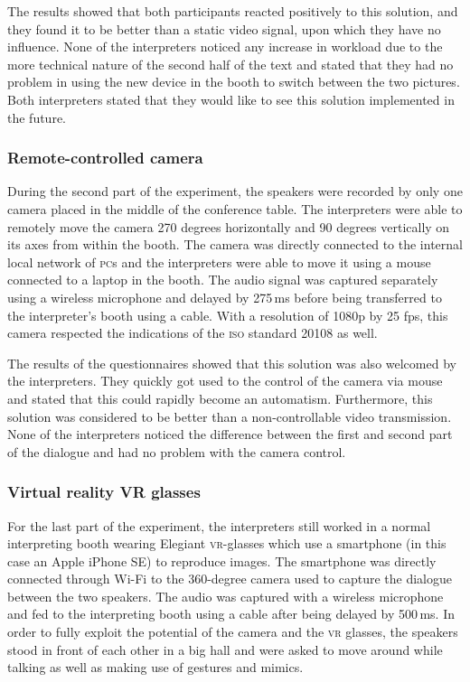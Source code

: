 \documentclass[output=paper]{langsci/langscibook}
\begin{document}
The results showed that both participants reacted positively to this solution, and they found it to be better than a static video signal, upon which they have no influence. None of the interpreters noticed any increase in workload due to the more technical nature of the second half of the text and stated that they had no problem in using the new device in the booth to switch between the two pictures. Both interpreters stated that they would like to see this solution implemented in the future.

\subsubsection{Remote-controlled camera}

During the second part of the experiment, the speakers were recorded by only one camera placed in the middle of the conference table. The interpreters were able to remotely move the camera 270 degrees horizontally and 90 degrees vertically on its axes from within the booth. The camera was directly connected to the internal local network of \textsc{pc}s and the interpreters were able to move it using a mouse connected to a laptop in the booth. The audio signal was captured separately using a wireless microphone and delayed by 275\,ms before being transferred to the interpreter’s booth using a cable. With a resolution of 1080p by 25 fps, this camera respected the indications of the \textsc{iso} standard 20108 as well. 

The results of the questionnaires showed that this solution was also welcomed by the interpreters. They quickly got used to the control of the camera via mouse and stated that this could rapidly become an automatism. Furthermore, this solution was considered to be better than a non-controllable video transmission. None of the interpreters noticed the difference between the first and second part of the dialogue and had no problem with the camera control.

\subsubsection{Virtual reality \textsc{VR} glasses}
\largerpage
For the last part of the experiment, the interpreters still worked in a normal interpreting booth wearing Elegiant \textsc{vr}-glasses which use a smartphone (in this case an Apple iPhone SE) to reproduce images. The smartphone was directly connected through Wi-Fi to the 360-degree camera used to capture the dialogue between the two speakers. The audio was captured with a wireless microphone and fed to the interpreting booth using a cable after being delayed by 500\,ms. In order to fully exploit the potential of the camera and the \textsc{vr} glasses, the speakers stood in front of each other in a big hall and were asked to move around while talking as well as making use of gestures and mimics.
\end{document}
